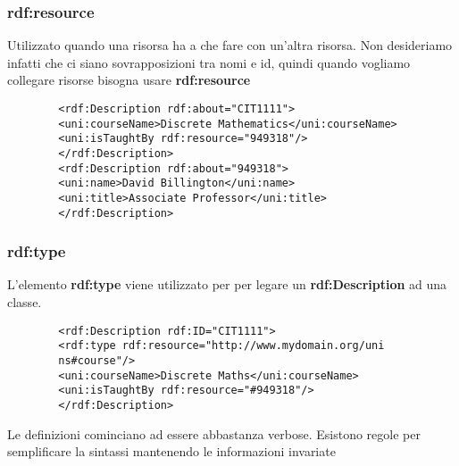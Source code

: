 \subsubsection{rdf:resource}
Utilizzato quando una risorsa ha a che fare con un'altra risorsa. Non desideriamo infatti che ci siano sovrapposizioni tra nomi e id, quindi quando vogliamo collegare risorse bisogna usare \textbf{rdf:resource}

\begin{info}[Esempio]
	\begin{verbatim}
		<rdf:Description rdf:about="CIT1111">
		<uni:courseName>Discrete Mathematics</uni:courseName>
		<uni:isTaughtBy rdf:resource="949318"/>
		</rdf:Description>
		<rdf:Description rdf:about="949318">
		<uni:name>David Billington</uni:name>
		<uni:title>Associate Professor</uni:title>
		</rdf:Description>
	\end{verbatim}
\end{info}

\subsubsection{rdf:type}
L'elemento \textbf{rdf:type} viene utilizzato per per legare un \textbf{rdf:Description} ad una classe.
\begin{info}[Esempio]
	\begin{verbatim}
		<rdf:Description rdf:ID="CIT1111">
		<rdf:type rdf:resource="http://www.mydomain.org/uni
		ns#course"/>
		<uni:courseName>Discrete Maths</uni:courseName>
		<uni:isTaughtBy rdf:resource="#949318"/>
		</rdf:Description>
	\end{verbatim}
\end{info}
Le definizioni cominciano ad essere abbastanza verbose. Esistono regole per semplificare la sintassi mantenendo le informazioni invariate
